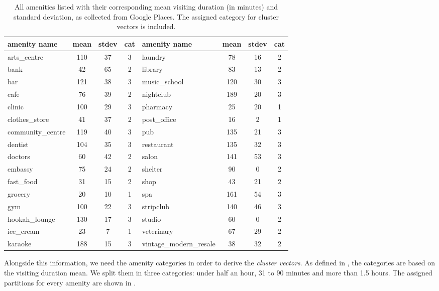 \begin{table}[!ht]
	\footnotesize
	\begin{tabular}{ | l | c | c | c || l | c | c | c |}
		\hline		
		\textbf{amenity name} & \textbf{mean} & \textbf{stdev} & \textbf{cat} & \textbf{amenity name} & \textbf{mean} & \textbf{stdev} & \textbf{cat} \\ \hline
		arts\_centre  & 110 & 37 & 3 & laundry  & 78 & 16 & 2 \\ \hline
		bank  & 42 & 65 & 2 &  library  & 83 & 13 & 2 \\ \hline
		bar  & 121 & 38 & 3 &  music\_school  & 120 & 30 & 3 \\ \hline
		cafe  & 76 & 39 & 2 &  nightclub  & 189 & 20 & 3 \\ \hline
		clinic  & 100 & 29 & 3 &  pharmacy  & 25 & 20 & 1 \\ \hline
		clothes\_store  & 41 & 37 & 2 &  post\_office  & 16 & 2 & 1 \\ \hline
		community\_centre  & 119 & 40 & 3 &  pub  & 135 & 21 & 3 \\ \hline
		dentist  & 104 & 35 & 3 &  restaurant  & 135 & 32 & 3 \\ \hline
		doctors  & 60 & 42 & 2 &  salon  & 141 & 53 & 3 \\ \hline
		embassy  & 75 & 24 & 2 &  shelter  & 90 & 0 & 2 \\ \hline
		fast\_food  & 31 & 15 & 2 &  shop  & 43 & 21 & 2 \\ \hline
		grocery  & 20 & 10 & 1 &  spa  & 161 & 54 & 3 \\ \hline
		gym  & 100 & 22 & 3 &  stripclub  & 140 & 46 & 3 \\ \hline
		hookah\_lounge  & 130 & 17 & 3 &  studio  & 60 & 0 & 2 \\ \hline
		ice\_cream  & 23 & 7 & 1 &  veterinary  & 67 & 29 & 2 \\ \hline
		karaoke  & 188 & 15 & 3 & {\scriptsize vintage\_modern\_resale}  & 38 & 32 & 2 \\ \hline
	\end{tabular}
	\caption{All amenities listed with their corresponding mean visiting duration (in minutes) and standard deviation, as collected from Google Places.
The assigned category for cluster vectors is included.}
	\label{tab:amenities_google_places}
\end{table}

Alongside this information, we need the amenity categories in order to derive the \textit{cluster vectors}.
As defined in , the categories are based on the visiting duration mean.
We split them in three categories: under half an hour, 31 to 90 minutes and more than 1.5 hours. 
The assigned partitions for every amenity are shown in . 

